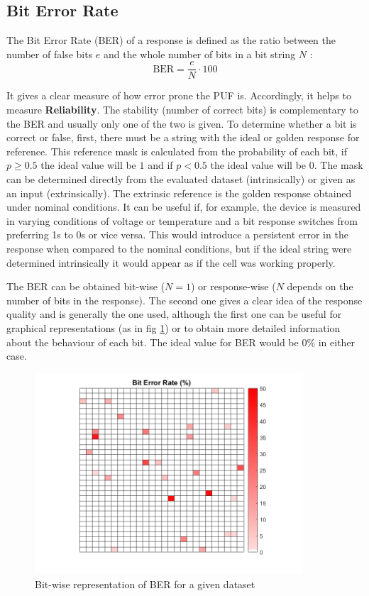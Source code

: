 \subsection{Bit Error Rate}

The Bit Error Rate (BER) of a response is defined as the ratio between the number of false bits $e$ and the whole number of bits in a bit string $N$ \cite{Bohm2013}:
\begin{equation}
\label{eq:BER}
\text{BER}=\frac{e}{N}\cdot 100
\end{equation}


It gives a clear measure of how error prone the PUF is. Accordingly, it helps to measure \textbf{Reliability}. The stability (number of correct bits) is complementary to the BER and usually only one of the two is given. To determine whether a bit is correct or false, first, there must be a string with the ideal or golden response for reference. This reference mask is calculated from the probability of each bit, if $p\geq 0.5$ the ideal value will be $1$ and if $p< 0.5$ the ideal value will be $0$. The mask can be determined directly from the evaluated dataset (intrinsically) or given as an input (extrinsically). The extrinsic reference is the golden response obtained under nominal conditions. It can be useful if, for example, the device is measured in varying conditions of voltage or temperature and a bit response switches from preferring 1s to 0s or vice versa. This would introduce a persistent error in the response when compared to the nominal conditions, but if the ideal string were determined intrinsically it would appear as if the cell was working properly. 

The BER can be obtained bit-wise ($N=1$) or response-wise ($N$ depends on the number of bits in the response). The second one gives a clear idea of the response quality and is generally the one used, although the first one can be useful for graphical representations (as in fig \ref{fig:BER}) or to obtain more detailed information about the behaviour of each bit. The ideal value for BER would be 0\% in either case.


\begin{figure}[H]
    \centering
    \includegraphics[width=10cm]{images/BERexample.png}
    \caption{Bit-wise representation of BER for a given dataset}
    \label{fig:BER}
\end{figure}
